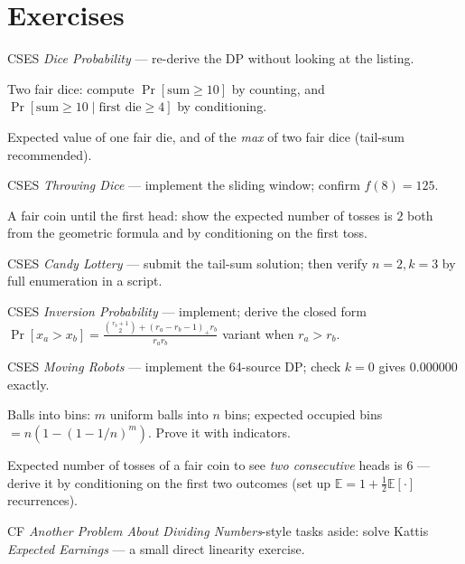 \section*{Exercises}
\begin{exercise}[easy] CSES \emph{Dice Probability} --- re-derive the DP without looking at the listing. \end{exercise}
\begin{exercise}[easy] Two fair dice: compute $\Pr[\text{sum}\ge10]$ by counting, and $\Pr[\text{sum}\ge10\mid \text{first die}\ge4]$ by conditioning. \end{exercise}
\begin{exercise}[easy] Expected value of one fair die, and of the \emph{max} of two fair dice (tail-sum recommended). \end{exercise}
\begin{exercise}[easy] CSES \emph{Throwing Dice} --- implement the sliding window; confirm $f(8)=125$. \end{exercise}
\begin{exercise}[easy] A fair coin until the first head: show the expected number of tosses is $2$ both from the geometric formula and by conditioning on the first toss. \end{exercise}
\begin{exercise}[medium] CSES \emph{Candy Lottery} --- submit the tail-sum solution; then verify $n=2,k=3$ by full enumeration in a script. \end{exercise}
\begin{exercise}[medium] CSES \emph{Inversion Probability} --- implement; derive the closed form $\Pr[x_a>x_b]=\frac{\binom{r_b+1}{2}+(r_a-r_b-1)_+ r_b}{r_a r_b}$ variant when $r_a>r_b$. \end{exercise}
\begin{exercise}[medium] CSES \emph{Moving Robots} --- implement the 64-source DP; check $k=0$ gives $0.000000$ exactly. \end{exercise}
\begin{exercise}[medium] Balls into bins: $m$ uniform balls into $n$ bins; expected occupied bins $=n(1-(1-1/n)^m)$. Prove it with indicators. \end{exercise}
\begin{exercise}[medium] Expected number of tosses of a fair coin to see \emph{two consecutive} heads is $6$ --- derive it by conditioning on the first two outcomes (set up $\mathbb{E}=1+\tfrac12\mathbb{E}[\cdot]$ recurrences). \end{exercise}
\begin{exercise}[medium] CF \emph{Another Problem About Dividing Numbers}-style tasks aside: solve Kattis \emph{Expected Earnings} --- a small direct linearity exercise. \end{exercise}
